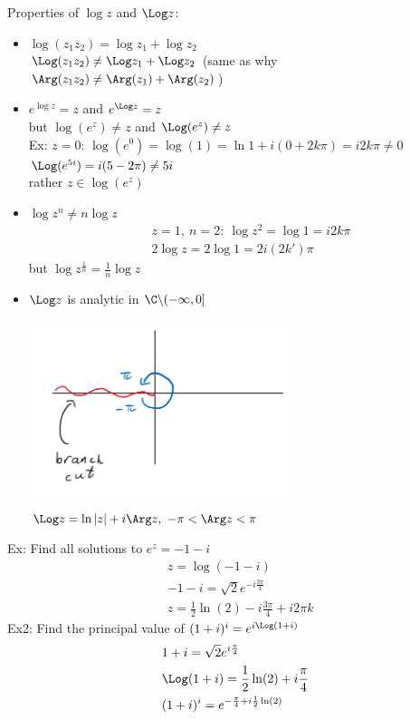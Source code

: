 Properties of $\log z$ and $\Log z$:
\begin{itemize}
    \item $\log(z_1z_2)=\log z_1+\log z_2$\\
    $\Log(z_1z_2)\neq\Log z_1+\Log z_2$ (same as why $\Arg(z_1z_2)\neq\Arg(z_1)+\Arg(z_2)$)
    \item $e^{\log z}=z$ and $e^{\Log z}=z$\\
    but $\log(e^z)\neq z$ and $\Log(e^z)\neq z$\\
    Ex: $z=0$: $\log(e^0)=\log(1)=\ln1+i(0+2k\pi)=i2k\pi\neq0$\\
    $\Log(e^{5i})=i(5-2\pi)\neq 5i$\\
    rather $z\in\log(e^z)$
    \item $\log z^n\neq n\log z$
    \begin{align*}
        &z=1,\ n=2:\ \log z^2=\log 1=i2k\pi\\
        &2\log z=2\log 1=2i(2k')\pi
    \end{align*}
    but $\log z^\frac{1}{n}=\frac{1}{n}\log z$
    \item $\Log z$ is analytic in $\C\backslash(-\infty,0]$\\
    \centerline{\includegraphics[width=0.6\textwidth]{Images/ComplexAnalysisPictures/BranchCut.png}}
    $\Log z=\ln|z|+i\Arg z,\ -\pi<\Arg z<\pi$
\end{itemize}
Ex: Find all solutions to $e^z=-1-i$
\begin{align*}
    &z=\log(-1-i)\\
    &-1-i=\sqrt{2}e^{-i\frac{3\pi}{4}}\\
    &z=\frac{1}{2}\ln(2)-i\frac{3\pi}{4}+i2\pi k
\end{align*}
Ex2: Find the principal value of $(1+i)^i=e^{i\Log(1+i)}$
\begin{align*}
    &1+i=\sqrt{2}e^{i\frac{\pi}{4}}\\
    &\Log(1+i)=\frac{1}{2}\ln(2)+i\frac{\pi}{4}\\
    &(1+i)^i=e^{-\frac{\pi}{4}+i\frac{1}{2}\ln(2)}
\end{align*}
